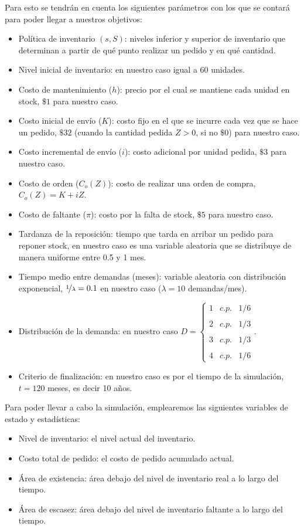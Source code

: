 Para esto se tendrán en cuenta los siguientes parámetros con los que se contará para poder llegar a nuestros objetivos:
\begin{itemize}
    \item Política de inventario $(s, S)$: niveles inferior y superior de inventario que determinan a partir de qué punto realizar un pedido y en qué cantidad.
    \item Nivel inicial de inventario: en nuestro caso igual a $60$ unidades.
    \item Costo de mantenimiento ($h$): precio por el cual se mantiene cada unidad en stock, $\$ 1$ para nuestro caso.
    \item Costo inicial de envío ($K$): costo fijo en el que se incurre cada vez que se hace un pedido, $\$ 32$ (cuando la cantidad pedida $Z > 0$, si no $\$ 0$) para nuestro caso.
    \item Costo incremental de envío ($i$): costo adicional por unidad pedida, $\$ 3$ para nuestro caso.
    \item Costo de orden ($C_o(Z)$): costo de realizar una orden de compra, $C_o(Z) = K + iZ$.
    \item Costo de faltante ($\pi$): costo por la falta de stock, $\$ 5$ para nuestro caso.
    \item Tardanza de la reposición: tiempo que tarda en arribar un pedido para reponer stock, en nuestro caso es una variable aleatoria que se distribuye de manera uniforme entre 0.5 y 1 mes.
    \item Tiempo medio entre demandas (meses): variable aleatoria con distribución exponencial, $\nicefrac{1}{\lambda} = 0.1$ en nuestro caso ($\lambda = 10$ demandas/mes).
    \item Distribución de la demanda: en nuestro caso $D=\left\{ \begin{array}{lcc}
            1 &   c.p.  & 1/6 \\
            \\ 2 &  c.p. & 1/3 \\
            \\ 3 &  c.p. & 1/3 \\
            \\ 4 &  c.p.  & 1/6
  \end{array}
  \right.$.
    \item Criterio de finalización: en nuestro caso es por el tiempo de la simulación, $t = 120$ meses, es decir 10 años.
\end{itemize}

Para poder llevar a cabo la simulación, emplearemos las siguientes variables de estado y estadísticas:
\begin{itemize}
    \item Nivel de inventario: el nivel actual del inventario.
    \item Costo total de pedido: el costo de pedido acumulado actual.
    \item Área de existencia: área debajo del nivel de inventario real a lo largo del tiempo.
    \item Área de escasez: área debajo del nivel de inventario faltante a lo largo del tiempo.
\end{itemize}

